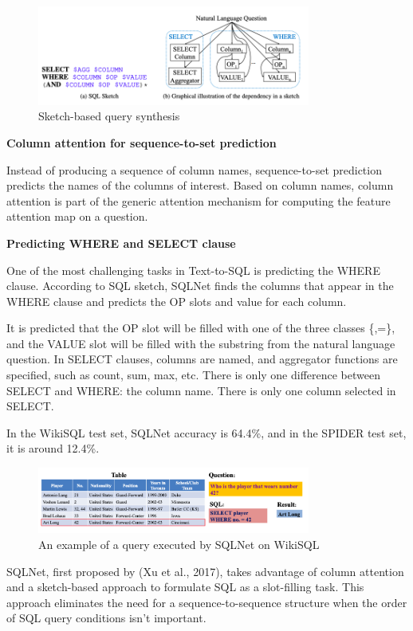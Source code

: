 \begin{figure}[htb]
    \centering
    \includegraphics[width=0.8\textwidth]{pics/sqlnet/sketch-based.png}
    \caption{Sketch-based query synthesis}
    \label{fig:sketch-based}
\end{figure}

\textbf{Column attention for sequence-to-set prediction}

Instead of producing a sequence of column names, sequence-to-set prediction predicts the names of the columns of interest.
Based on column names, column attention is part of the generic attention mechanism for computing the feature attention map on a question.

\textbf{Predicting WHERE and SELECT clause}

One of the most challenging tasks in Text-to-SQL is predicting the WHERE clause.
According to SQL sketch, SQLNet finds the columns that appear in the WHERE clause and predicts the OP slots and value for each column.

It is predicted that the OP slot will be filled with one of the three classes \{<,>,=\}, and the VALUE slot will be filled with the substring from the natural language question.
In SELECT clauses, columns are named, and aggregator functions are specified, such as count, sum, max, etc. There is only one difference between SELECT and WHERE: the column name. There is only one column selected in SELECT.

In the WikiSQL test set, SQLNet accuracy is 64.4\%, and in the SPIDER test set, it is around 12.4\%.

\begin{figure}[htb]
    \centering
    \includegraphics[width=0.8\textwidth]{pics/sqlnet/sqlnet-task.png}
    \caption{An example of a query executed by SQLNet on WikiSQL}
    \label{fig:sqlnet-task}
\end{figure}


SQLNet, first proposed by (Xu et al., 2017), takes advantage of column attention and a sketch-based approach to formulate SQL as a slot-filling task. This approach eliminates the need for a sequence-to-sequence structure when the order of SQL query conditions isn't important.